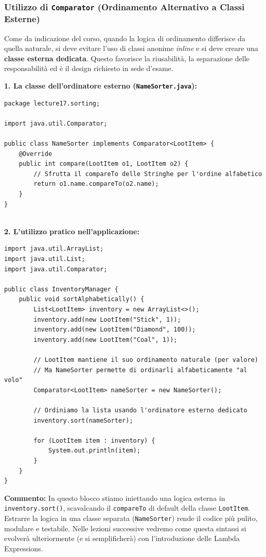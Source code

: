 \documentclass[12pt, a4paper]{article}
\begin{document}
\subsubsection{Utilizzo di \texttt{Comparator} (Ordinamento Alternativo a Classi Esterne)}
Come da indicazione del corso, quando la logica di ordinamento differisce da quella naturale, si deve evitare l'uso di classi anonime \textit{inline} e si deve creare una \textbf{classe esterna dedicata}. Questo favorisce la riusabilità, la separazione delle responsabilità ed è il design richiesto in sede d'esame.

\textbf{1. La classe dell'ordinatore esterno (\texttt{NameSorter.java}):}
\begin{verbatim}
package lecture17.sorting;

import java.util.Comparator;

public class NameSorter implements Comparator<LootItem> {
    @Override
    public int compare(LootItem o1, LootItem o2) {
        // Sfrutta il compareTo delle Stringhe per l'ordine alfabetico
        return o1.name.compareTo(o2.name);
    }
}


\end{verbatim}

\textbf{2. L'utilizzo pratico nell'applicazione:}
\begin{verbatim}
import java.util.ArrayList;
import java.util.List;
import java.util.Comparator;

public class InventoryManager {
    public void sortAlphabetically() {
        List<LootItem> inventory = new ArrayList<>();
        inventory.add(new LootItem("Stick", 1));
        inventory.add(new LootItem("Diamond", 100));
        inventory.add(new LootItem("Coal", 1));

        // LootItem mantiene il suo ordinamento naturale (per valore)
        // Ma NameSorter permette di ordinarli alfabeticamente "al volo"
        Comparator<LootItem> nameSorter = new NameSorter();
        
        // Ordiniamo la lista usando l'ordinatore esterno dedicato
        inventory.sort(nameSorter);

        for (LootItem item : inventory) {
            System.out.println(item);
        }
    }
}
\end{verbatim}
\textbf{Commento:} In questo blocco stiamo iniettando una logica esterna in \texttt{inventory.sort()}, scavalcando il \texttt{compareTo} di default della classe \texttt{LootItem}. Estrarre la logica in una classe separata (\texttt{NameSorter}) rende il codice più pulito, modulare e testabile. Nelle lezioni successive vedremo come questa sintassi si evolverà ulteriormente (e si semplificherà) con l'introduzione delle Lambda Expressions.
\end{document}

